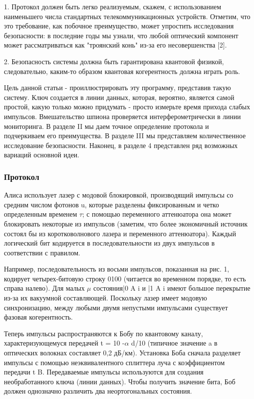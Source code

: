 1. Протокол должен быть легко реализуемым, скажем, с использованием наименьшего числа стандартных телекоммуникационных устройств. Отметим, что это требование, как побочное преимущество, может упростить исследования безопасности: в последние годы мы узнали, что любой оптический компонент может рассматриваться как "троянский конь" из-за его несовершенства [2].

2. Безопасность системы должна быть гарантирована квантовой физикой, следовательно, каким-то образом квантовая когерентность должна играть роль.

Цель данной статьи - проиллюстрировать эту программу, представив такую систему. Ключ создается в линии данных, которая, вероятно, является самой простой, какую только можно придумать - просто измерьте время прихода слабых импульсов. Вмешательство шпиона проверяется интерферометрически в линии мониторинга. В разделе II мы даем точное определение протокола и подчеркиваем его преимущества. В разделе III мы представляем количественное исследование безопасности. Наконец, в разделе 4 представлен ряд возможных вариаций основной идеи.


\subsubsection{Протокол}

Алиса использует лазер с модовой блокировкой, производящий импульсы со средним числом фотонов u, которые разделены фиксированным и четко определенным временем $\tau$; с помощью переменного аттенюатора она может блокировать некоторые из импульсов (заметим, что более экономичный источник состоял бы из коротковолнового лазера и переменного аттенюатора). Каждый логический бит кодируется в последовательности из двух импульсов в соответствии с правилом.

Например, последовательность из восьми импульсов, показанная на рис. 1, кодирует четырех-битовую строку 0100 (читается во временном порядке, то есть справа налево). Для малых $\mu$ состояния|0 A i и |1 A i имеют большое перекрытие из-за их вакуумной составляющей. Поскольку лазер имеет модовую синхронизацию, между любыми двумя непустыми импульсами существует фазовая когерентность.

Теперь импульсы распространяются к Бобу по квантовому каналу, характеризующемуся передачей t = 10 -$\alpha$ d/10 (типичное значение a в оптических волокнах составляет 0,2 дБ/км).
Установка Боба сначала разделяет импульсы с помощью неэквивалентного сплиттера луча с коэффициентом передачи t B. Передаваемые импульсы используются для создания необработанного ключа (линии данных). Чтобы получить значение бита, Боб должен однозначно различить два неортогональных состояния.

